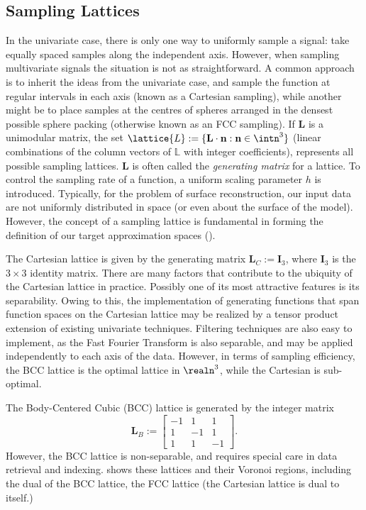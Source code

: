 \subsection{Sampling Lattices} \label{sec:smpl_review}
In the univariate case, there is only one way to uniformly sample a signal: take equally spaced samples along the independent axis. However, when sampling multivariate signals the situation is not as straightforward. A common approach is to inherit the ideas from the univariate case, and sample the function at regular intervals in each axis (known as a Cartesian sampling), while another might be to place samples at the centres of spheres arranged in the densest possible sphere packing (otherwise known as an FCC sampling). If $\mathbf{L}$ is a unimodular matrix, the set $\lattice{L} := \{\mathbf{L}\cdot\mathbf{n} : \mathbf{n} \in \intn^3 \}$ (linear combinations of the column vectors of $\mathbb{L}$ with integer coefficients), represents all possible sampling lattices. $\mathbf{L}$ is often called the \emph{generating matrix} for a lattice. To control the sampling rate of a function, a uniform scaling parameter $h$ is introduced. Typically, for the problem of surface reconstruction, our input data are not uniformly distributed in space (or even about the surface of the model). However, the concept of a sampling lattice is fundamental in forming the definition of our target approximation spaces ().

The Cartesian lattice is given by the generating matrix $\mathbf{L}_C:=\mathbf{I}_3$, where $\mathbf{I}_3$ is the $3 \times 3$ identity matrix. There are many factors that contribute to the ubiquity of the Cartesian lattice in practice. Possibly one of its most attractive features is its separability. Owing to this, the implementation of generating functions that span function spaces on the Cartesian lattice may be realized by a tensor product extension of existing univariate techniques. Filtering techniques are also easy to implement, as the Fast Fourier Transform is also separable, and may be applied independently to each axis of the data. However, in terms of sampling efficiency, the BCC lattice is the optimal lattice in $\realn^3$, while the Cartesian is sub-optimal.

The Body-Centered Cubic (BCC) lattice is generated by the integer matrix  {\footnotesize
\begin{equation*} 
	\mathbf{L}_B := 
	\begin{bmatrix}
		-1 & 1 & 1 \\ 
		1 & -1 & 1 \\ 
		1 & 1 & -1 
	\end{bmatrix}.
\end{equation*}}
However, the BCC lattice is non-separable, and requires special care in data retrieval and indexing.  shows these lattices and their Voronoi regions, including the dual of the BCC lattice, the FCC lattice (the Cartesian lattice is dual to itself.)

